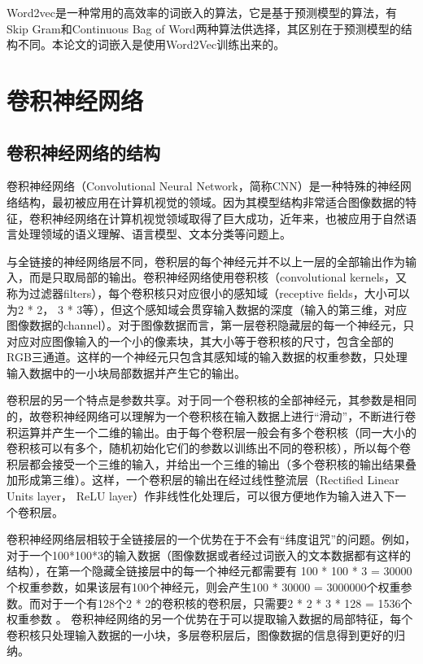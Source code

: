 Word2vec是一种常用的高效率的词嵌入的算法，它是基于预测模型的算法，有Skip Gram和Continuous Bag of Word两种算法供选择，其区别在于预测模型的结构不同。本论文的词嵌入是使用Word2Vec训练出来的。

\section{卷积神经网络}
\subsection{卷积神经网络的结构}
卷积神经网络（Convolutional Neural Network，简称CNN）是一种特殊的神经网络结构，最初被应用在计算机视觉的领域。因为其模型结构非常适合图像数据的特征，卷积神经网络在计算机视觉领域取得了巨大成功，近年来，也被应用于自然语言处理领域的语义理解、语言模型、文本分类等问题上。

与全链接的神经网络层不同，卷积层的每个神经元并不以上一层的全部输出作为输入，而是只取局部的输出。卷积神经网络使用卷积核（convolutional kernels，又称为过滤器filters），每个卷积核只对应很小的感知域（receptive fields，大小可以为2 * 2， 3 * 3等），但这个感知域会贯穿输入数据的深度（输入的第三维，对应图像数据的channel）。对于图像数据而言，第一层卷积隐藏层的每一个神经元，只对应对应图像输入的一个小的像素块，其大小等于卷积核的尺寸，包含全部的RGB三通道。这样的一个神经元只包含其感知域的输入数据的权重参数，只处理输入数据中的一小块局部数据并产生它的输出。

卷积层的另一个特点是参数共享。对于同一个卷积核的全部神经元，其参数是相同的，故卷积神经网络可以理解为一个卷积核在输入数据上进行“滑动”，不断进行卷积运算并产生一个二维的输出。由于每个卷积层一般会有多个卷积核（同一大小的卷积核可以有多个，随机初始化它们的参数以训练出不同的卷积核），所以每个卷积层都会接受一个三维的输入，并给出一个三维的输出（多个卷积核的输出结果叠加形成第三维）。这样，一个卷积层的输出在经过线性整流层（Rectified Linear Units layer， ReLU layer）作非线性化处理后，可以很方便地作为输入进入下一个卷积层。

卷积神经网络层相较于全链接层的一个优势在于不会有“纬度诅咒”的问题。例如，对于一个100*100*3的输入数据（图像数据或者经过词嵌入的文本数据都有这样的结构），在第一个隐藏全链接层中的每一个神经元都需要有 100 * 100 * 3 = 30000个权重参数，如果该层有100个神经元，则会产生100 * 30000 = 3000000个权重参数。而对于一个有128个2 * 2的卷积核的卷积层，只需要2 * 2 * 3 * 128 = 1536个权重参数 。
卷积神经网络的另一个优势在于可以提取输入数据的局部特征，每个卷积核只处理输入数据的一小块，多层卷积层后，图像数据的信息得到更好的归纳。

